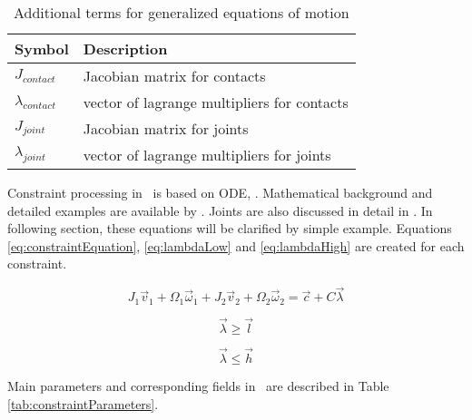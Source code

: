 \begin {table}[htb!]
\begin{center}
\begin{tabular}{|l| l|}
\hline
{\bf Symbol} & {\bf Description} \\  \hline
$J_{contact}$ & Jacobian matrix for contacts  \\ \hline
$\lambda_{contact}$ & vector of lagrange multipliers for contacts  \\ \hline
$J_{joint}$ & Jacobian matrix for joints  \\ \hline
$\lambda_{joint}$ & vector of lagrange multipliers for joints  \\ \hline
\end {tabular}
\end{center}
\caption {Additional terms  for generalized equations of motion} \label{tab:eom-g}
\end {table}

Constraint processing in \bullet\ is based on ODE, \cite{ode}.
Mathematical background and detailed examples are available by \cite{ode.joints}.
Joints are also discussed in detail in  \citet[p.~60-90]{erleben.thesis}.
In following section, these equations will be clarified by simple example.
Equations \ref{eq:constraintEquation}, \ref{eq:lambdaLow} and
\ref{eq:lambdaHigh} 
are created for each constraint.

\begin{equation} \label{eq:constraintEquation}
J_1 \vec{v}_1 + \Omega_1 \vec{\omega}_1 + 
J_2 \vec{v}_2 + \Omega_2 \vec{\omega}_2 = \vec{c} + C \vec{\lambda}
\end{equation}

\begin{equation} \label{eq:lambdaLow}
\vec{\lambda} \geq \vec{l}
\end{equation}

\begin{equation} \label{eq:lambdaHigh}
\vec{\lambda} \leq \vec{h}
\end{equation}

Main parameters  and corresponding fields in \bullet\  
 are described in Table \ref{tab:constraintParameters}.

